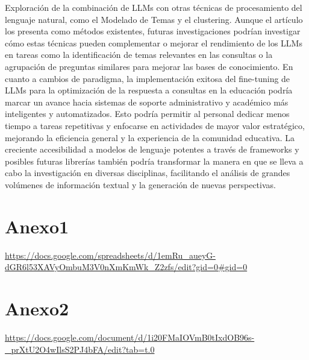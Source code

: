 \documentclass[12pt,twocolumn]{article}
\begin{document}
Exploración de la combinación de LLMs con otras técnicas de procesamiento del lenguaje natural, como el Modelado de Temas y el clustering. Aunque el artículo los presenta como métodos existentes, futuras investigaciones podrían investigar cómo estas técnicas pueden complementar o mejorar el rendimiento de los LLMs en tareas como la identificación de temas relevantes en las consultas o la agrupación de preguntas similares para mejorar las bases de conocimiento.
En cuanto a cambios de paradigma, la implementación exitosa del fine-tuning de LLMs para la optimización de la respuesta a consultas en la educación podría marcar un avance hacia sistemas de soporte administrativo y académico más inteligentes y automatizados. Esto podría permitir al personal dedicar menos tiempo a tareas repetitivas y enfocarse en actividades de mayor valor estratégico, mejorando la eficiencia general y la experiencia de la comunidad educativa. 
La creciente accesibilidad a modelos de lenguaje potentes a través de frameworks y posibles futuras librerías también podría transformar la manera en que se lleva a cabo la investigación en diversas disciplinas, facilitando el análisis de grandes volúmenes de información textual y la generación de nuevas perspectivas.
\section{Anexo1}
\url{https://docs.google.com/spreadsheets/d/1emRu_aueyG-dGR6l53XAVyOmbuM3V0nXmKmWk_Z2zfs/edit?gid=0#gid=0}
\section{Anexo2}
\url{https://docs.google.com/document/d/1i20FMaIOVmB0tIxdOB96s-_prXtU2O4wIlsS2PJ4bFA/edit?tab=t.0}
%
\printbibliography
%
\end{document}
